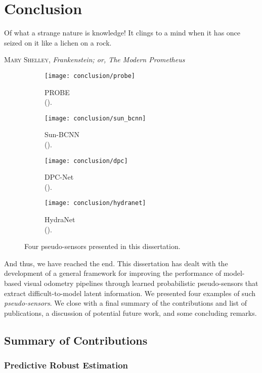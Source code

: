 \chapter{Conclusion}
\epigraph{Of what a strange nature is knowledge! It clings to a mind when it has once seized on it like a lichen on a rock.}{\textsc{Mary Shelley}, \textit{Frankenstein; or, The Modern Prometheus}}

\begin{figure}
\begin{subfigure}[]{0.24\textwidth}
    \texttt{[image: conclusion/probe]}
  \caption{PROBE \\ ().}
\end{subfigure}
\begin{subfigure}[]{0.24\textwidth}
    \texttt{[image: conclusion/sun\_bcnn]}
  \caption{Sun-BCNN \\ ().}
\end{subfigure}
\begin{subfigure}[]{0.24\textwidth}
    \texttt{[image: conclusion/dpc]}
  \caption{DPC-Net \\ ().}
\end{subfigure}
\begin{subfigure}[]{0.24\textwidth}
    \texttt{[image: conclusion/hydranet]}
  \caption{HydraNet \\ ().}
\end{subfigure}
\caption{Four pseudo-sensors presented in this dissertation.}
\end{figure}

And thus, we have reached the end. This dissertation has dealt with the development of a general framework for improving the performance of model-based visual odometry pipelines through learned probabilistic pseudo-sensors that extract difficult-to-model latent information.  We presented four examples of such \textit{pseudo-sensors}. We close with a final summary of the contributions and list of publications, a discussion of potential future work, and some concluding remarks.

\section{Summary of Contributions}

\subsection{Predictive Robust Estimation}

